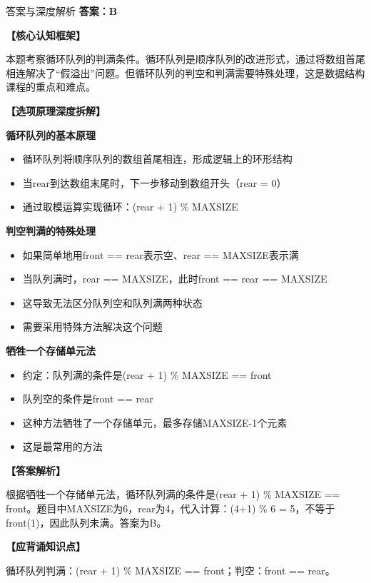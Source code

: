 \documentclass[12pt, a4paper]{article}
\newenvironment{bluebox}{\begin{framed}\begin{minipage}{\linewidth}}{\end{minipage}\end{framed}}
\begin{document}
\begin{bluebox}{答案与深度解析}
	\textbf{答案：B}

	\textbf{【核心认知框架】}

	本题考察循环队列的判满条件。循环队列是顺序队列的改进形式，通过将数组首尾相连解决了“假溢出”问题。但循环队列的判空和判满需要特殊处理，这是数据结构课程的重点和难点。

	\textbf{【选项原理深度拆解】}

	\item \textbf{循环队列的基本原理}
	\begin{itemize}
		\item 循环队列将顺序队列的数组首尾相连，形成逻辑上的环形结构
		\item 当rear到达数组末尾时，下一步移动到数组开头（rear = 0）
		\item 通过取模运算实现循环：(rear + 1) \% MAXSIZE
	\end{itemize}

	\item \textbf{判空判满的特殊处理}
	\begin{itemize}
		\item 如果简单地用front == rear表示空、rear == MAXSIZE表示满
		\item 当队列满时，rear == MAXSIZE，此时front == rear == MAXSIZE
		\item 这导致无法区分队列空和队列满两种状态
		\item 需要采用特殊方法解决这个问题
	\end{itemize}

	\item \textbf{牺牲一个存储单元法}
	\begin{itemize}
		\item 约定：队列满的条件是(rear + 1) \% MAXSIZE == front
		\item 队列空的条件是front == rear
		\item 这种方法牺牲了一个存储单元，最多存储MAXSIZE-1个元素
		\item 这是最常用的方法
	\end{itemize}

	\textbf{【答案解析】}

	根据牺牲一个存储单元法，循环队列满的条件是(rear + 1) \% MAXSIZE == front。题目中MAXSIZE为6，rear为4，代入计算：(4+1) \% 6 = 5，不等于front(1)，因此队列未满。答案为B。

	\textbf{【应背诵知识点】}

	循环队列判满：(rear + 1) \% MAXSIZE == front；判空：front == rear。
\end{bluebox}
\end{document}
